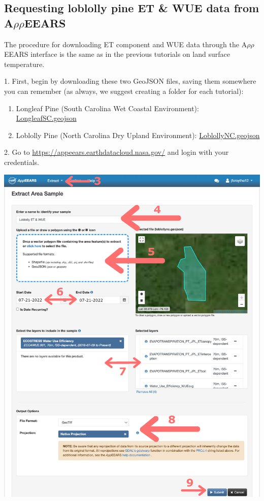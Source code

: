 \documentclass[oneside,a4paper,11pt,explicit]{book}
\begin{document}
\subsection{Requesting loblolly pine ET \& WUE data from A$\rho\rho$EEARS}

The procedure for downloading ET component and WUE data through the A$\rho\rho$EEARS interface is the same as in the previous tutorials on land surface temperature.

1. First, begin by downloading these two GeoJSON files, saving them somewhere you can remember (as always, we suggest creating a folder for each tutorial):

\begin{enumerate}
	\item Longleaf Pine (South Carolina Wet Coastal Environment): \href{https://jeremydforsythe.github.io/icecream-tutorials/Tutorial10_Evapotranspiration2/LongleafSC Shapefile/LongleafSC.geojson}{LongleafSC.geojson}
	\item Loblolly Pine (North Carolina Dry Upland Environment): \href{https://jeremydforsythe.github.io/icecream-tutorials/Tutorial10_Evapotranspiration2/LoblollyNC Shapefile/LoblollyNC.geojson}{LoblollyNC.geojson}
\end{enumerate}
 


2. Go to \href{https://appeears.earthdatacloud.nasa.gov/}{https://appeears.earthdatacloud.nasa.gov/} and login with your credentials. 

\centerline{\includegraphics[width=.6\textwidth]{WUERequest.png}}
\end{document}
